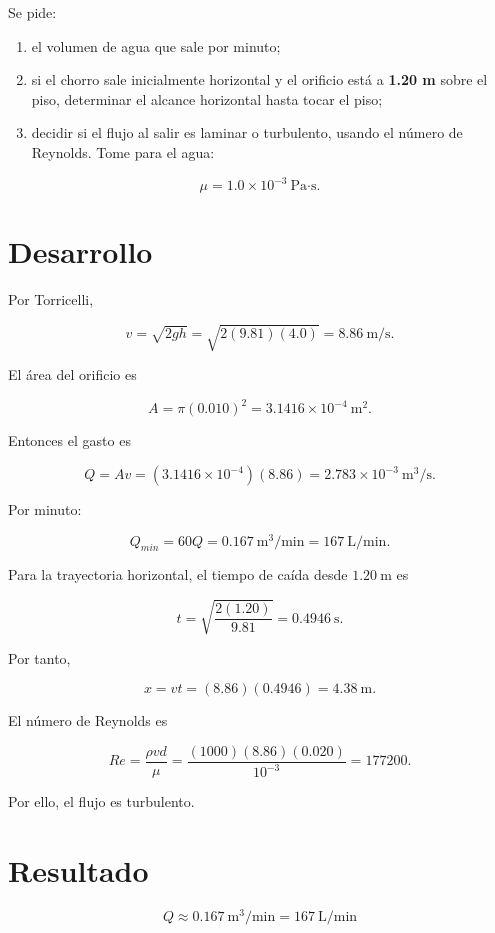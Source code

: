 \documentclass[
  letterpaper,
  DIV=11,
  numbers=noendperiod]{scrreprt}
\begin{document}
Se pide:

\begin{enumerate}
\def\labelenumi{\alph{enumi})}
\item
  el volumen de agua que sale por minuto;
\item
  si el chorro sale inicialmente horizontal y el orificio está a
  \textbf{1.20 m} sobre el piso, determinar el alcance horizontal hasta
  tocar el piso;
\item
  decidir si el flujo al salir es laminar o turbulento, usando el número
  de Reynolds. Tome para el agua:
\end{enumerate}

\[
\mu = 1.0\times10^{-3}\ \text{Pa·s}.
\]

\section{Desarrollo}\label{desarrollo-2}

Por Torricelli,

\[
v = \sqrt{2gh}=\sqrt{2(9.81)(4.0)}=8.86\ \text{m/s}.
\]

El área del orificio es

\[
A=\pi(0.010)^2=3.1416\times10^{-4}\ \text{m}^2.
\]

Entonces el gasto es

\[
Q=Av=(3.1416\times10^{-4})(8.86)=2.783\times10^{-3}\ \text{m}^3/\text{s}.
\]

Por minuto:

\[
Q_{min}=60Q=0.167\ \text{m}^3/\text{min}=167\ \text{L/min}.
\]

Para la trayectoria horizontal, el tiempo de caída desde
\(1.20\ \text{m}\) es

\[
t=\sqrt{\frac{2(1.20)}{9.81}}=0.4946\ \text{s}.
\]

Por tanto,

\[
x=vt=(8.86)(0.4946)=4.38\ \text{m}.
\]

El número de Reynolds es

\[
Re=\frac{\rho vd}{\mu}=\frac{(1000)(8.86)(0.020)}{10^{-3}}=177200.
\]

Por ello, el flujo es turbulento.

\section{Resultado}\label{resultado-3}

\[
\boxed{Q\approx 0.167\ \text{m}^3/\text{min}=167\ \text{L/min}}
\]
\end{document}
